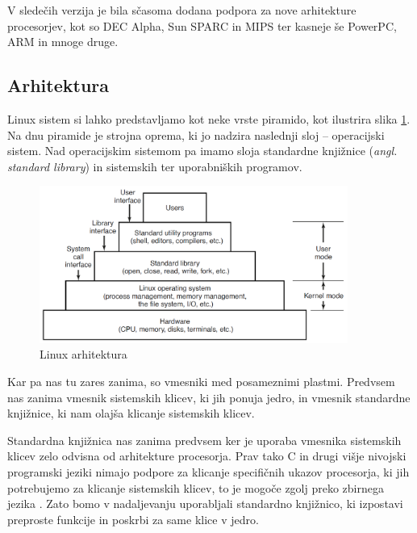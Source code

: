 \documentclass[a4paper,12pt,openright]{book}
\begin{document}
V sledečih verzija je bila sčasoma dodana podpora za nove arhitekture procesorjev, kot so DEC Alpha, Sun SPARC in MIPS ter kasneje še PowerPC, ARM in mnoge druge.

\subsection{Arhitektura}

Linux sistem si lahko predstavljamo kot neke vrste piramido, kot ilustrira slika \ref{fig:linux_architecture}.
Na dnu piramide je strojna oprema, ki jo nadzira naslednji sloj -- operacijski sistem.
Nad operacijskim sistemom pa imamo sloja standardne knjižnice (\textit{angl. standard library}) in sistemskih ter uporabniških programov.

\begin{figure}[h!]
	\begin{center}
		\includegraphics[width=0.9\textwidth]{images/linux_layers.png}
	\end{center}
	\caption{Linux arhitektura \cite{Tanenbaum_Bos_2023}}
	\label{fig:linux_architecture}
\end{figure}

Kar pa nas tu zares zanima, so vmesniki med posameznimi plastmi.
Predvsem nas zanima vmesnik sistemskih klicev, ki jih ponuja jedro, in vmesnik standardne knjižnice, ki nam olajša klicanje sistemskih klicev.

Standardna knjižnica nas zanima predvsem ker je uporaba vmesnika sistemskih klicev zelo odvisna od arhitekture procesorja.
Prav tako C in drugi višje nivojski programski jeziki nimajo podpore za klicanje specifičnih ukazov procesorja, ki jih potrebujemo za klicanje sistemskih klicev, to je mogoče zgolj preko zbirnega jezika \cite{Tanenbaum_Bos_2023}.
Zato bomo v nadaljevanju uporabljali standardno knjižnico, ki izpostavi preproste funkcije in poskrbi za same klice v jedro.
\end{document}
